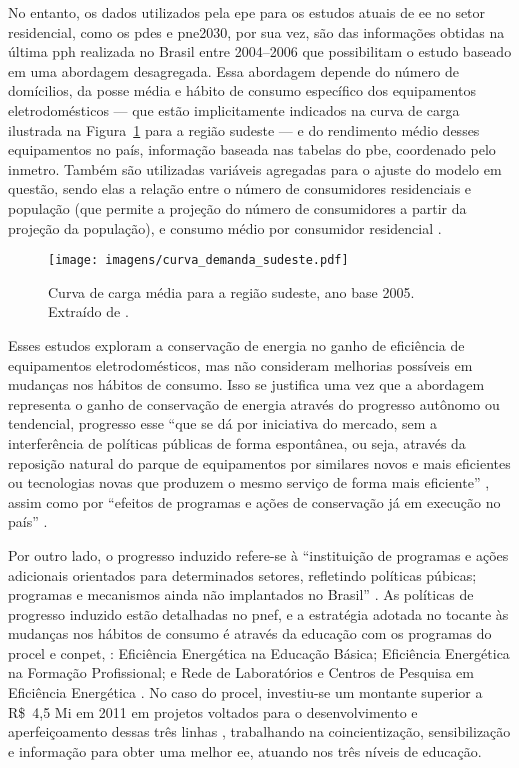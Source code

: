 No entanto, os dados utilizados pela \gls{epe} para os estudos atuais
de \gls{ee} no setor residencial, como os \glspl{pde} e \gls{pne2030},
por sua vez, são das informações obtidas na última \gls{pph} realizada
no Brasil entre 2004--2006 que possibilitam o estudo baseado em uma
abordagem desagregada. Essa abordagem depende do número de domícilios,
da posse média e hábito de consumo específico dos equipamentos
eletrodomésticos --- que estão implicitamente indicados na curva de
carga ilustrada na Figura~\ref{fig:curva_carga} para a região sudeste
--- e do rendimento médio desses equipamentos no país, informação
baseada nas tabelas do \gls{pbe}, coordenado pelo \gls{inmetro}.
Também são utilizadas variáveis agregadas para o ajuste do modelo em
questão, sendo elas a relação entre o número de consumidores
residenciais e população (que permite a projeção do número de
consumidores a partir da projeção da população), e consumo médio por
consumidor residencial
\cite{epe_eficiencia_2012,pde_2020,pne30_eff_energ}. 

\begin{figure}[h!t]
\centering
\texttt{[image: imagens/curva\_demanda\_sudeste.pdf]}
\caption[Curva de carga média para a região sudeste, ano base 2005.]{Curva de
carga média para a região sudeste, ano base 2005. Extraído de
\cite{result_procel_2005}.}
\label{fig:curva_carga}
\end{figure}

Esses estudos exploram a conservação de energia no ganho de eficiência 
de equipamentos eletrodomésticos, mas não consideram melhorias possíveis
em mudanças nos hábitos de consumo. Isso se justifica uma vez que a abordagem 
representa o ganho de conservação de energia através do progresso autônomo
ou tendencial, progresso esse ``que se dá por iniciativa do mercado, sem a
interferência de políticas públicas de forma espontânea, ou seja, através da
reposição natural do parque de equipamentos por similares novos e mais
eficientes ou tecnologias novas que produzem o mesmo serviço de forma mais
eficiente'' \cite[p.1]{pnef}, assim como por ``efeitos de programas e ações de
conservação já em execução no país'' \cite[p.247]{pde_2020}. 

Por outro lado, o progresso induzido refere-se à ``instituição de programas e ações
adicionais orientados para determinados setores, refletindo políticas púbicas;
programas e mecanismos ainda não implantados no Brasil'' \cite[p.247]{pde_2020}.
As políticas de progresso induzido estão detalhadas no \gls{pnef}, e a
estratégia adotada no tocante às mudanças nos hábitos de consumo é através da
educação com os programas do \gls{procel} e \gls{conpet}, : Eficiência Energética na Educação Básica; Eficiência 
Energética na Formação Profissional; e Rede de Laboratórios e Centros de Pesquisa em Eficiência
Energética \cite[cap.5]{pnef}. No caso do \gls{procel}, investiu-se um montante superior a
R\$~4,5 Mi em 2011 em projetos voltados para o desenvolvimento e
aperfeiçoamento dessas três linhas \cite{procel_resultados_2012}, trabalhando na
coincientização, sensibilização e informação para obter uma melhor \gls{ee},
atuando nos três níveis de educação.

